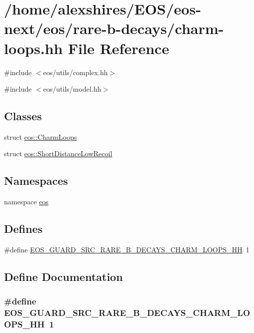 \hypertarget{charm-loops_8hh}{
\section{/home/alexshires/EOS/eos-\/next/eos/rare-\/b-\/decays/charm-\/loops.hh File Reference}
\label{charm-loops_8hh}
}
{\ttfamily \#include $<$eos/utils/complex.hh$>$}\par
{\ttfamily \#include $<$eos/utils/model.hh$>$}\par
\subsection*{Classes}
\begin{DoxyCompactItemize}
\item 
struct \hyperlink{structeos_1_1CharmLoops}{eos::CharmLoops}
\item 
struct \hyperlink{structeos_1_1ShortDistanceLowRecoil}{eos::ShortDistanceLowRecoil}
\end{DoxyCompactItemize}
\subsection*{Namespaces}
\begin{DoxyCompactItemize}
\item 
namespace \hyperlink{namespaceeos}{eos}
\end{DoxyCompactItemize}
\subsection*{Defines}
\begin{DoxyCompactItemize}
\item 
\#define \hyperlink{charm-loops_8hh_a69bd0fff42281bb2678a5822db3b6f8c}{EOS\_\-GUARD\_\-SRC\_\-RARE\_\-B\_\-DECAYS\_\-CHARM\_\-LOOPS\_\-HH}~1
\end{DoxyCompactItemize}


\subsection{Define Documentation}
\hypertarget{charm-loops_8hh_a69bd0fff42281bb2678a5822db3b6f8c}{
\subsubsection[{EOS\_\-GUARD\_\-SRC\_\-RARE\_\-B\_\-DECAYS\_\-CHARM\_\-LOOPS\_\-HH}]{\setlength{\rightskip}{0pt plus 5cm}\#define EOS\_\-GUARD\_\-SRC\_\-RARE\_\-B\_\-DECAYS\_\-CHARM\_\-LOOPS\_\-HH~1}}
\label{charm-loops_8hh_a69bd0fff42281bb2678a5822db3b6f8c}
